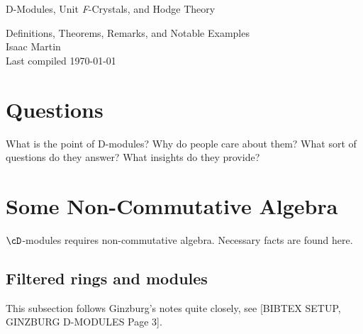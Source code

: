 


\pagestyle{empty}
\begin{center}
	\Large
	\begin{LARGE}
		D-Modules, Unit \textit{F}-Crystals, and Hodge Theory \\
	\end{LARGE}
	Definitions, Theorems, Remarks, and Notable Examples \\
	Isaac Martin \\
    Last compiled \today
\end{center}
\normalsize
\vspace{-2mm}
\hru

\tableofcontents
\newpage
\section{Questions}
\begin{question}\label{q:D-mod-why-care}
	What is the point of D-modules? Why do people care about them? What sort of questions do they answer? What insights do they provide?
\end{question}
\section{Some Non-Commutative Algebra}
$\cD$-modules requires non-commutative algebra. Necessary facts are found here.
\subsection{Filtered rings and modules}
This subsection follows Ginzburg's notes quite closely, see [BIBTEX SETUP, GINZBURG D-MODULES Page 3]. 

